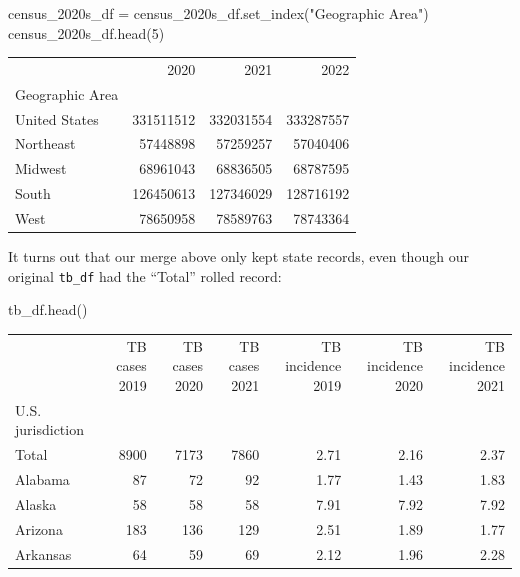 \documentclass[
  letterpaper,
  DIV=11,
  numbers=noendperiod]{scrreprt}
\newenvironment{Shaded}{\begin{snugshade}}{\end{snugshade}}
\newcommand{\DecValTok}[1]{\textcolor[rgb]{0.68,0.00,0.00}{#1}}
\newcommand{\NormalTok}[1]{\textcolor[rgb]{0.00,0.23,0.31}{#1}}
\newcommand{\OperatorTok}[1]{\textcolor[rgb]{0.37,0.37,0.37}{#1}}
\newcommand{\StringTok}[1]{\textcolor[rgb]{0.13,0.47,0.30}{#1}}
\begin{document}
\begin{Shaded}
\begin{Highlighting}[]
\NormalTok{census\_2020s\_df }\OperatorTok{=}\NormalTok{ census\_2020s\_df.set\_index(}\StringTok{"Geographic Area"}\NormalTok{)}
\NormalTok{census\_2020s\_df.head(}\DecValTok{5}\NormalTok{)}
\end{Highlighting}
\end{Shaded}

\begin{tabular}{lrrr}
\toprule
{} &       2020 &       2021 &       2022 \\
Geographic Area &            &            &            \\
\midrule
United States   &  331511512 &  332031554 &  333287557 \\
Northeast       &   57448898 &   57259257 &   57040406 \\
Midwest         &   68961043 &   68836505 &   68787595 \\
South           &  126450613 &  127346029 &  128716192 \\
West            &   78650958 &   78589763 &   78743364 \\
\bottomrule
\end{tabular}

It turns out that our merge above only kept state records, even though
our original \texttt{tb\_df} had the ``Total'' rolled record:

\begin{Shaded}
\begin{Highlighting}[]
\NormalTok{tb\_df.head()}
\end{Highlighting}
\end{Shaded}

\begin{tabular}{lrrrrrr}
\toprule
{} &  TB cases 2019 &  TB cases 2020 &  TB cases 2021 &  TB incidence 2019 &  TB incidence 2020 &  TB incidence 2021 \\
U.S. jurisdiction &                &                &                &                    &                    &                    \\
\midrule
Total             &           8900 &           7173 &           7860 &               2.71 &               2.16 &               2.37 \\
Alabama           &             87 &             72 &             92 &               1.77 &               1.43 &               1.83 \\
Alaska            &             58 &             58 &             58 &               7.91 &               7.92 &               7.92 \\
Arizona           &            183 &            136 &            129 &               2.51 &               1.89 &               1.77 \\
Arkansas          &             64 &             59 &             69 &               2.12 &               1.96 &               2.28 \\
\bottomrule
\end{tabular}
\end{document}
